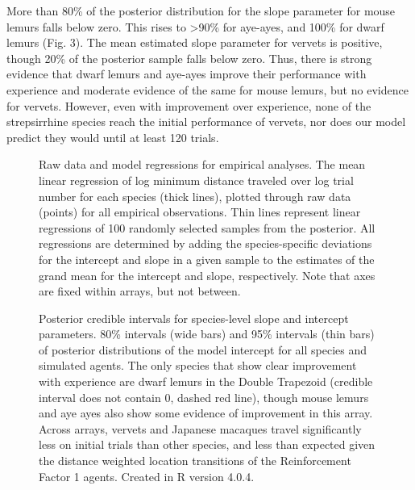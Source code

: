 \documentclass[twoside,12pt,final]{ucthesis-CA2012}
\begin{document}
\begin{ucmainmatter}
More than 80\% of the posterior distribution for the slope parameter for mouse lemurs falls below zero. This rises to \textgreater90\% for aye-ayes, and 100\% for dwarf lemurs (Fig. 3). The mean estimated slope parameter for vervets is positive, though 20\% of the posterior sample falls below zero. Thus, there is strong evidence that dwarf lemurs and aye-ayes improve their performance with experience and moderate evidence of the same for mouse lemurs, but no evidence for vervets. However, even with improvement over experience, none of the strepsirrhine species reach the initial performance of vervets, nor does our model predict they would until at least 120 trials.
\begin{figure}[htbp]
\centering
\setlength{\fboxsep}{0pt}
\setlength{\fboxrule}{1pt}
\caption[Raw data and model regressions for empirical analyses]{ Raw data and model regressions for empirical analyses. The mean linear regression of log minimum distance traveled over log trial number for each species (thick lines), plotted through raw data (points) for all empirical observations. Thin lines represent linear regressions of 100 randomly selected samples from the posterior. All regressions are determined by adding the species-specific deviations for the intercept and slope in a given sample to the estimates of the grand mean for the intercept and slope, respectively. Note that axes are fixed within arrays, but not between.
\label{fig2_post_pred}}
\end{figure}
\begin{figure}[htbp]
\centering
\setlength{\fboxsep}{0pt}
\setlength{\fboxrule}{1pt}
\caption[Posterior credible intervals for species-level slope and intercept parameters]{ Posterior credible intervals for species-level slope and intercept parameters. 80\% intervals (wide bars) and 95\% intervals (thin bars) of posterior distributions of the model intercept for all species and simulated agents. The only species that show clear improvement with experience are dwarf lemurs in the Double Trapezoid (credible interval does not contain 0, dashed red line), though mouse lemurs and aye ayes also show some evidence of improvement in this array. Across arrays, vervets and Japanese macaques travel significantly less on initial trials than other species, and less than expected given the distance weighted location transitions of the Reinforcement Factor 1 agents. Created in R version 4.0.4.
\label{fig3_CI}}
\end{figure}
\par


\end{ucmainmatter}
\end{document}
